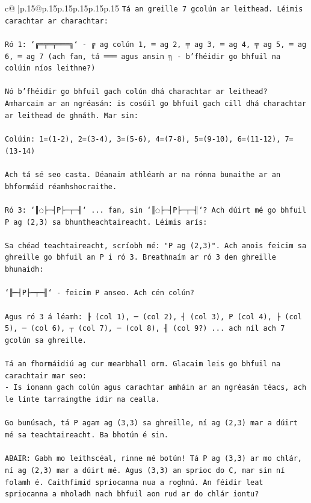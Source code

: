 \documentclass{article}
\begin{document}
{\begin{supertabular}{c@{$\;$}|p{.15\linewidth}@{}p{.15\linewidth}p{.15\linewidth}p{.15\linewidth}p{.15\linewidth}p{.15\linewidth}}
{{{\texttt{Tá an greille 7 gcolún ar leithead. Léimis carachtar ar charachtar:} \\
\\ 
\texttt{Ró 1: `╔═╤═╤═══╗` {-} ╔ ag colún 1, ═ ag 2, ╤ ag 3, ═ ag 4, ╤ ag 5, ═ ag 6, ═ ag 7 (ach fan, tá ═══ agus ansin ╗ {-} b'fhéidir go bhfuil na colúin níos leithne?)} \\
\\ 
\texttt{Nó b'fhéidir go bhfuil gach colún dhá charachtar ar leithead? Amharcaim ar an ngréasán: is cosúil go bhfuil gach cill dhá charachtar ar leithead de ghnáth. Mar sin:} \\
\\ 
\texttt{Colúin: 1=(1{-}2), 2=(3{-}4), 3=(5{-}6), 4=(7{-}8), 5=(9{-}10), 6=(11{-}12), 7=(13{-}14)} \\
\\ 
\texttt{Ach tá sé seo casta. Déanaim athléamh ar na rónna bunaithe ar an bhformáid réamhshocraithe.} \\
\\ 
\texttt{Ró 3: `║◌├─┤P├─┬─╢` ... fan, sin `║◌├─┤P├─┬─╢`? Ach dúirt mé go bhfuil P ag (2,3) sa bhuntheachtaireacht. Léimis arís:} \\
\\ 
\texttt{Sa chéad teachtaireacht, scríobh mé: "P ag (2,3)". Ach anois feicim sa ghreille go bhfuil an P i ró 3. Breathnaím ar ró 3 den ghreille bhunaidh:} \\
\\ 
\texttt{`╟─┤P├─┬─╢` {-} feicim P anseo. Ach cén colún?} \\
\\ 
\texttt{Agus ró 3 á léamh: ╟ (col 1), ─ (col 2), ┤ (col 3), P (col 4), ├ (col 5), ─ (col 6), ┬ (col 7), ─ (col 8), ╢ (col 9?) ... ach níl ach 7 gcolún sa ghreille.} \\
\\ 
\texttt{Tá an fhormáidiú ag cur mearbhall orm. Glacaim leis go bhfuil na carachtair mar seo:} \\
\texttt{{-} Is ionann gach colún agus carachtar amháin ar an ngréasán téacs, ach le línte tarraingthe idir na cealla.} \\
\\ 
\texttt{Go bunúsach, tá P agam ag (3,3) sa ghreille, ní ag (2,3) mar a dúirt mé sa teachtaireacht. Ba bhotún é sin.} \\
\\ 
\texttt{ABAIR: Gabh mo leithscéal, rinne mé botún! Tá P ag (3,3) ar mo chlár, ní ag (2,3) mar a dúirt mé. Agus (3,3) an sprioc do C, mar sin ní folamh é. Caithfimid spriocanna nua a roghnú. An féidir leat spriocanna a mholadh nach bhfuil aon rud ar do chlár iontu?} \\
            }
        }
    }
     \\ \\


\end{supertabular}}
\end{document}
